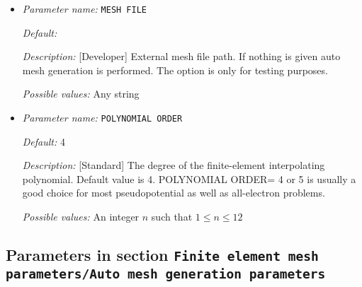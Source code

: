 \begin{itemize}
\item {\it Parameter name:} {\tt MESH FILE}
\label{parameters:Finite element mesh parameters/MESH FILE}
\label{parameters:Finite_20element_20mesh_20parameters/MESH_20FILE}




{\it Default:} 


{\it Description:} [Developer] External mesh file path. If nothing is given auto mesh generation is performed. The option is only for testing purposes.


{\it Possible values:} Any string
\item {\it Parameter name:} {\tt POLYNOMIAL ORDER}
\label{parameters:Finite element mesh parameters/POLYNOMIAL ORDER}
\label{parameters:Finite_20element_20mesh_20parameters/POLYNOMIAL_20ORDER}




{\it Default:} 4


{\it Description:} [Standard] The degree of the finite-element interpolating polynomial. Default value is 4. POLYNOMIAL ORDER= 4 or 5 is usually a good choice for most pseudopotential as well as all-electron problems.


{\it Possible values:} An integer $n$ such that $1\leq n \leq 12$
\end{itemize}



\subsection{Parameters in section \tt Finite element mesh parameters/Auto mesh generation parameters}
\label{parameters:Finite_20element_20mesh_20parameters/Auto_20mesh_20generation_20parameters}


